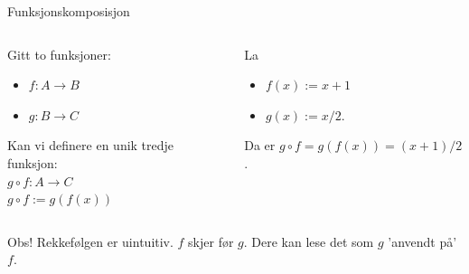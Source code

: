 \begin{frame}{Funksjonskomposisjon}
    \begin{columns}
        \begin{column}{0.38\textwidth}
        Gitt to funksjoner:
        \begin{itemize}
            \item $f : A \rightarrow B$
            \item $g : B \rightarrow C$
        \end{itemize}
        Kan vi definere en unik tredje funksjon: \\
        $g \circ f : A \rightarrow C$\\
        $g \circ f := g(f(x))$\\
        \pause
        \end{column}
        \begin{column}{0.55\textwidth}
            La \begin{itemize}
                \item $f(x) := x+1$
                \item $g(x) := x/2$.
            \end{itemize}
            \pause
            Da er $g \circ f = g(f(x)) = (x+1)/2$.\\
            \pause
            \begin{figure}
                \pause
                \centering
                \qquad
                \label{fig:g o f}
            \end{figure}
        \end{column}
    \end{columns}
    \pause
    Obs! Rekkefølgen er uintuitiv. $f$ skjer før $g$. Dere kan lese det som $g$ 'anvendt på' $f$.
\end{frame}


